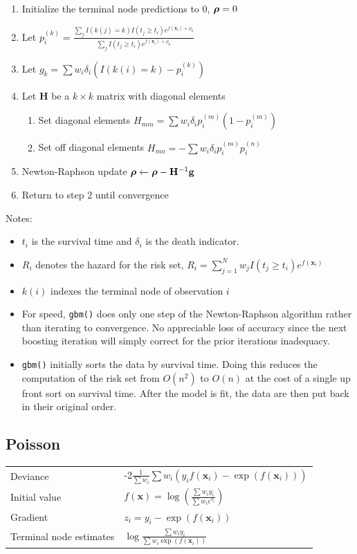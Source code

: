 \documentclass{article}
\newcommand{\mathgbf}[1]{{\mbox{\boldmath$#1$\unboldmath}}}
\begin{document}
\begin{enumerate}
  \item Initialize the terminal node predictions to 0, $\mathgbf{\rho}=0$
  \item Let $\displaystyle
             p_i^{(k)}=\frac{\sum_j I(k(j)=k)I(t_j\geq t_i)e^{f(\mathbf{x}_i)+\rho_k}}
                            {\sum_j I(t_j\geq t_i)e^{f(\mathbf{x}_i)+\rho_k}}$
  \item Let $g_k=\sum w_i\delta_i\left(I(k(i)=k)-p_i^{(k)}\right)$
  \item Let $\mathbf{H}$ be a $k\times k$ matrix with diagonal elements
  \begin{enumerate}
     \item Set diagonal elements $H_{mm}=\sum w_i\delta_i p_i^{(m)}\left(1-p_i^{(m)}\right)$
     \item Set off diagonal elements $H_{mn}=-\sum w_i\delta_i p_i^{(m)}p_i^{(n)}$
  \end{enumerate}
  \item Newton-Raphson update $\mathgbf{\rho} \leftarrow \mathgbf{\rho} - \mathbf{H}^{-1}\mathbf{g}$
  \item Return to step 2 until convergence
\end{enumerate}

Notes:
\begin{itemize}
\item $t_i$ is the survival time and $\delta_i$ is the death indicator.
\item $R_i$ denotes the hazard for the risk set, $R_i=\sum_{j=1}^N w_jI(t_j\geq t_i)e^{f(\mathbf{x}_i)}$
\item $k(i)$ indexes the terminal node of observation $i$
\item For speed, \texttt{gbm()} does only one step of the Newton-Raphson algorithm rather than iterating to convergence. No appreciable loss of accuracy since the next boosting iteration will simply correct for the prior iterations inadequacy.
\item \texttt{gbm()} initially sorts the data by survival time. Doing this reduces the computation of the risk set from $O(n^2)$ to $O(n)$ at the cost of a single up front sort on survival time. After the model is fit, the data are then put back in their original order.
\end{itemize}

\subsection{Poisson}
\begin{tabular}{ll}
Deviance & -2$\frac{1}{\sum w_i} \sum w_i(y_if(\mathbf{x}_i)-\exp(f(\mathbf{x}_i)))$ \\
Initial value & $\displaystyle f(\mathbf{x})= \log\left(\frac{\sum w_iy_i}{\sum w_ie^{o_i}}\right)$ \\
Gradient & $z_i=y_i - \exp(f(\mathbf{x}_i))$ \\
Terminal node estimates & $\displaystyle \log\frac{\sum w_iy_i}{\sum w_i\exp(f(\mathbf{x}_i))}$
\end{tabular}
\end{document}
